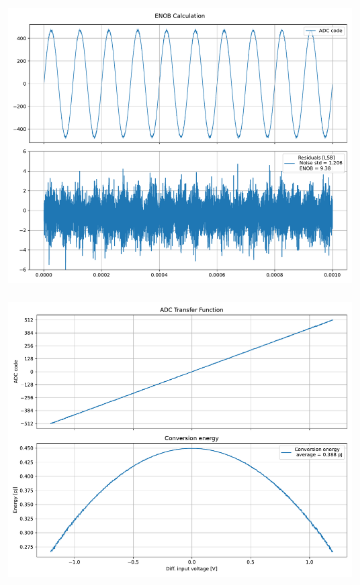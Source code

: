 \documentclass[varwidth]{standalone}
\begin{document}
\begin{figure}
\begin{subfigure}{0.32\textwidth}
    \includegraphics[width=\textwidth]{behavioral_10b_noisy_radix175norm_enob.pdf}
\end{subfigure}
\begin{subfigure}{0.32\textwidth}
    \begin{table}
    \let\center\empty
    \let\endcenter\relax
    \centering
    \resizebox{0.3\width}{!}{}
    \end{table}
    \includegraphics[width=\textwidth]{behavioral_10b_noisy_radix175norm_energy.pdf}
\end{subfigure}
\end{figure}
\end{document}

